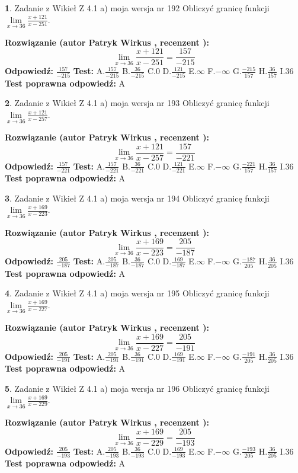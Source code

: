 \documentclass[12pt, a4paper]{article}
\theoremstyle{definition} %
\newtheorem{zad}{}
\newcommand{\zadStart}[1]{\begin{zad}#1\newline}
\newcommand{\zadStop}{\end{zad}}
\newcommand{\rozwStart}[2]{\noindent \textbf{Rozwiązanie (autor #1 , recenzent #2): }\newline}
\newcommand{\rozwStop}{\newline}
\newcommand{\odpStart}{\noindent \textbf{Odpowiedź:}\newline}
\newcommand{\odpStop}{\newline}
\newcommand{\testStart}{\noindent \textbf{Test:}\newline}
\newcommand{\testStop}{\newline}
\newcommand{\kluczStart}{\noindent \textbf{Test poprawna odpowiedź:}\newline}
\newcommand{\kluczStop}{\newline}
\begin{document}
\zadStart{Zadanie z Wikieł Z 4.1 a) moja wersja nr 192}
Obliczyć granicę funkcji $\lim\limits_{x\to36}\frac{x+121}{x-251}$.
\zadStop
\rozwStart{Patryk Wirkus}{}
$$\lim\limits_{x\to36}\frac{x+121}{x-251} = \frac{157}{-215}$$
\rozwStop
\odpStart
$\frac{157}{-215}$
\odpStop
\testStart
A.$\frac{157}{-215}$
B.$\frac{36}{-215}$
C.$0$
D.$\frac{121}{-215}$
E.$\infty$
F.$-\infty$
G.$\frac{-215}{157}$
H.$\frac{36}{157}$
I.$36$
\testStop
\kluczStart
A
\kluczStop



\zadStart{Zadanie z Wikieł Z 4.1 a) moja wersja nr 193}
Obliczyć granicę funkcji $\lim\limits_{x\to36}\frac{x+121}{x-257}$.
\zadStop
\rozwStart{Patryk Wirkus}{}
$$\lim\limits_{x\to36}\frac{x+121}{x-257} = \frac{157}{-221}$$
\rozwStop
\odpStart
$\frac{157}{-221}$
\odpStop
\testStart
A.$\frac{157}{-221}$
B.$\frac{36}{-221}$
C.$0$
D.$\frac{121}{-221}$
E.$\infty$
F.$-\infty$
G.$\frac{-221}{157}$
H.$\frac{36}{157}$
I.$36$
\testStop
\kluczStart
A
\kluczStop



\zadStart{Zadanie z Wikieł Z 4.1 a) moja wersja nr 194}
Obliczyć granicę funkcji $\lim\limits_{x\to36}\frac{x+169}{x-223}$.
\zadStop
\rozwStart{Patryk Wirkus}{}
$$\lim\limits_{x\to36}\frac{x+169}{x-223} = \frac{205}{-187}$$
\rozwStop
\odpStart
$\frac{205}{-187}$
\odpStop
\testStart
A.$\frac{205}{-187}$
B.$\frac{36}{-187}$
C.$0$
D.$\frac{169}{-187}$
E.$\infty$
F.$-\infty$
G.$\frac{-187}{205}$
H.$\frac{36}{205}$
I.$36$
\testStop
\kluczStart
A
\kluczStop



\zadStart{Zadanie z Wikieł Z 4.1 a) moja wersja nr 195}
Obliczyć granicę funkcji $\lim\limits_{x\to36}\frac{x+169}{x-227}$.
\zadStop
\rozwStart{Patryk Wirkus}{}
$$\lim\limits_{x\to36}\frac{x+169}{x-227} = \frac{205}{-191}$$
\rozwStop
\odpStart
$\frac{205}{-191}$
\odpStop
\testStart
A.$\frac{205}{-191}$
B.$\frac{36}{-191}$
C.$0$
D.$\frac{169}{-191}$
E.$\infty$
F.$-\infty$
G.$\frac{-191}{205}$
H.$\frac{36}{205}$
I.$36$
\testStop
\kluczStart
A
\kluczStop



\zadStart{Zadanie z Wikieł Z 4.1 a) moja wersja nr 196}
Obliczyć granicę funkcji $\lim\limits_{x\to36}\frac{x+169}{x-229}$.
\zadStop
\rozwStart{Patryk Wirkus}{}
$$\lim\limits_{x\to36}\frac{x+169}{x-229} = \frac{205}{-193}$$
\rozwStop
\odpStart
$\frac{205}{-193}$
\odpStop
\testStart
A.$\frac{205}{-193}$
B.$\frac{36}{-193}$
C.$0$
D.$\frac{169}{-193}$
E.$\infty$
F.$-\infty$
G.$\frac{-193}{205}$
H.$\frac{36}{205}$
I.$36$
\testStop
\kluczStart
A
\kluczStop
\end{document}
